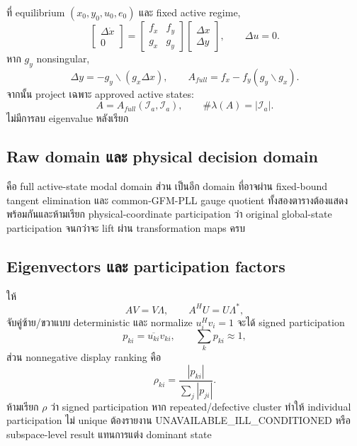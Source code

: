 \documentclass[12pt,a4paper]{article}
\newcommand{\code}[1]{\texttt{\detokenize{#1}}}
\begin{document}
ที่ equilibrium $(x_0,y_0,u_0,e_0)$ และ fixed active regime,
\begin{equation}
\begin{bmatrix}\Delta\dot x\\0\end{bmatrix}=
\begin{bmatrix}f_x&f_y\\g_x&g_y\end{bmatrix}
\begin{bmatrix}\Delta x\\\Delta y\end{bmatrix},\qquad \Delta u=0.
\end{equation}
หาก $g_y$ nonsingular,
\begin{equation}
\Delta y=-g_y\backslash(g_x\Delta x),\qquad
A_{full}=f_x-f_y(g_y\backslash g_x).
\end{equation}
จากนั้น project เฉพาะ approved active states:
\begin{equation}
A=A_{full}(\mathcal I_a,\mathcal I_a),\qquad
\#\lambda(A)=|\mathcal I_a|.
\end{equation}
ไม่มีการลบ eigenvalue หลังเรียก \code{eig}

\subsection{Raw domain และ physical decision domain}

\code{sssa.A} คือ full active-state modal domain ส่วน \code{sssa.physical_A}
เป็นอีก domain ที่อาจผ่าน fixed-bound tangent elimination และ common-GFM-PLL gauge
quotient ทั้งสองตารางต้องแสดงพร้อมกันและห้ามเรียก physical-coordinate participation
ว่า original global-state participation จนกว่าจะ lift ผ่าน transformation maps ครบ

\subsection{Eigenvectors และ participation factors}

ให้
\begin{equation}
AV=V\Lambda,\qquad A^HU=U\Lambda^*,
\end{equation}
จับคู่ซ้าย/ขวาแบบ deterministic และ normalize $u_i^Hv_i=1$ จะได้ signed participation
\begin{equation}
p_{ki}=\overline{u_{ki}}v_{ki},\qquad \sum_kp_{ki}\approx1,
\end{equation}
ส่วน nonnegative display ranking คือ
\begin{equation}
\rho_{ki}=\frac{|p_{ki}|}{\sum_j|p_{ji}|}.
\end{equation}
ห้ามเรียก $\rho$ ว่า signed participation หาก repeated/defective cluster ทำให้ individual
participation ไม่ unique ต้องรายงาน UNAVAILABLE\_ILL\_CONDITIONED หรือ subspace-level
result แทนการแต่ง dominant state
\end{document}
